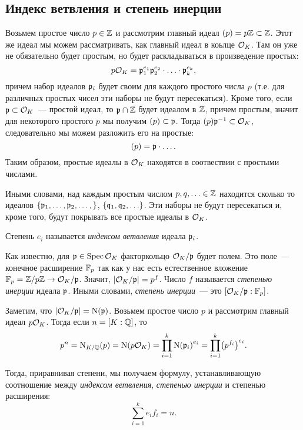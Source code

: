 	\subsection{Индекс ветвления и степень инерции}

	Возьмем простое число $p \in \mathbb{Z}$ и рассмотрим главный идеал $(p) = p\mathbb{Z} \subset \mathbb{Z}$. Этот же идеал мы можем рассматривать, как главный идеал в коьлце $\mathcal{O}_{K}$. Там он уже не обязательно будет простым, но будет раскладываться в произведение простых: 
	\[
		p\mathcal{O}_{K} = \mathfrak{p}_{1}^{e_1} \mathfrak{p}_{2}^{e_2} \cdot \ldots \cdot \mathfrak{p}_{k}^{e_k},
	\]
	причем набор идеалов $\mathfrak{p}_{i}$ будет своим для каждого простого числа $p$ (т.е. для различных простых чисел эти наборы не будут пересекаться). Кроме того, если $\mathfrak{p} \subset \mathcal{O}_{K}$~--- простой идеал, то $\mathfrak{p} \cap \mathbb{Z}$ будет идеалом в $\mathbb{Z}$, причем простым, значит для некоторого простого $p$ мы получим $(p) \subset \mathfrak{p}$. Тогда $(p) \mathfrak{p}^{-1} \subset \mathcal{O}_{K}$, следовательно мы можем разложить его на простые: 
	\[
		(p) = \mathfrak{p} \cdot \ldots.
	\]
	Таким образом, простые идеалы в $\mathcal{O}_{K}$ находятся в соотвествии с простыми числами. 

	Иными словами, над каждым простым числом $p, q, \ldots \in \mathbb{Z}$ находится сколько то идеалов $\{ \mathfrak{p}_{1}, \ldots, \mathfrak{p}_{2}, \ldots, \}$,  $\{ \mathfrak{q}_{1}, \mathfrak{q}_{2}, \ldots\}$. Эти наборы не будут пересекаться и, кроме того, будут покрывать все простые идеалы в $\mathcal{O}_{K}$.
	\begin{definition} 
		Степень $e_i$ называется \emph{индексом ветвления} идеала $\mathfrak{p}_{i}$.
	\end{definition}

	\begin{definition} 
		Как известно, для $\mathfrak{p} \in \operatorname{Spec}{\mathcal{O}_{K}}$ факторкольцо $\mathcal{O}_{K}/\mathfrak{p}$ будет полем. Это поле~--- конечное расширение $\mathbb{F}_{p}$ так как у нас есть естественное вложение $\mathbb{F}_{p}  = \mathbb{Z}/p\mathbb{Z} \to \mathcal{O}_{K}/\mathfrak{p}$. Значит, $\left\lvert \mathcal{O}_{K}/\mathfrak{p} \right\rvert = p^{f}$. Число $f$ называется \emph{степенью инерции} идеала $\mathfrak{p}$. Иными словами, \emph{степень инерции}~--- это $[\mathcal{O}_{K}/\mathfrak{p} : \mathbb{F}_{p}]$.
	\end{definition}

	Заметим, что $|\mathcal{O}_{K}/\mathfrak{p}| = \operatorname{\mathrm{N}}(\mathfrak{p})$. Возьмем простое число $p$ и рассмотрим главный идеал $p\mathcal{O}_{K}$. Тогда  если $n = [K : \mathbb{Q}]$, то
	\[
		p^n = \Nm_{K/\Q}(p) = \Nm\lr*{p\cO_{K}} = \prod_{i = 1}^{k} \Nm\lr*{\fp_{i}}^{e_{i}} = \prod_{i = 1}^{k} \lr*{p^{f_{i}}}^{e_i}.
	\]

	Тогда, приравнивая степени, мы получаем формулу, устанавливающую соотношение между \emph{индексом ветвления}, \emph{степенью инерции} и степенью расширения: 
	\begin{equation}
		\sum\limits_{i = 1}^{k} e_i f_i = n. \label{deg_ind_eq}
	\end{equation}

